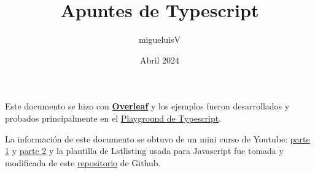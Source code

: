 \documentclass[12pt]{article}
\title{Apuntes de Typescript}
\author{migueluisV}
\date{Abril 2024}
\begin{document}
\renewcommand*\contentsname{Índice}
\renewcommand{\listtablename}{Índice de Tablas}
\renewcommand{\listfigurename}{Índice de Figuras}

\maketitle\newpage
\tableofcontents\newpage
\listoffigures\newpage
\listoftables\newpage

\hspace{0.55cm}Este documento se hizo con \textcolor{enlaces}{\href{https://es.overleaf.com/}{\textbf{Overleaf}}} y los ejemplos fueron desarrollados y probados principalmente en el \textcolor{enlaces}{\href{https://www.typescriptlang.org/play\#code/DYUwLgBARg9joEMB2MBc06KRAvBMATgK4gDcAUKJAMYIAmISC6AzoQJZIDmuEA5AAt4CPhSoQkRALYgCaCdKizeAVjHgFweZODBeO4OsicGAM07s68okjOcQdXjbtIHFctRhIW8EADotLgAKMABPAAcQGFMgnRgASnjSIA}{Playground de Typescript}}.

La información de este documento se obtuvo de un mini curso de Youtube: \textcolor{enlaces}{\href{https://youtu.be/fUgxxhI_bvc?si=JC9jUVCaxNaDS3_4}{parte 1}} y \textcolor{enlaces}{\href{https://youtu.be/L1ZSk-vPVKI?si=Qt65wJCFzYQnFbDn}{parte 2}} y la plantilla de Lstlisting usada para Javascript fue tomada y modificada de este \textcolor{enlaces}{\href{https://github.com/xgirma/latex-javaScript/tree/master}{repositorio}} de Github.





\end{document}
